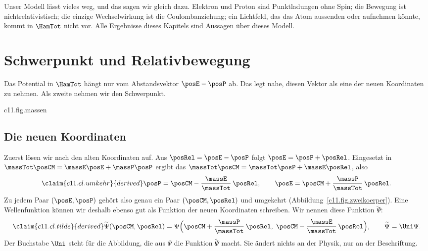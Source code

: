 Unser Modell lässt vieles weg, und das sagen wir gleich dazu. Elektron und Proton sind
Punktladungen ohne Spin; die Bewegung ist nichtrelativistisch; die einzige
Wechselwirkung ist die Coulombanziehung; ein Lichtfeld, das das Atom aussenden oder
aufnehmen könnte, kommt in $\HamTot$ nicht vor. Alle Ergebnisse dieses Kapitels sind
Aussagen über dieses Modell.

\section{Schwerpunkt und Relativbewegung}\label{c11.s2}

Das Potential in $\HamTot$ hängt nur vom Abstandsvektor $\posE - \posP$ ab. Das legt
nahe, diesen Vektor als eine der neuen Koordinaten zu nehmen. Als zweite nehmen wir den
Schwerpunkt.



\begin{tpcfigure}{c11.fig.massen}
  \caption{Wo der Schwerpunkt auf der Strecke vom Proton zum Elektron liegt: nach  im Abstand $(\massE/\massTot)\,\rad$ vom Proton. Bei gleichen Massen ist das die Mitte, beim Massenverhältnis aus Abbildung~\ref{c11.fig.zweikoerper} ein Viertel der Strecke. Im Wasserstoffatom ist das Proton so viel schwerer als das Elektron, dass der Schwerpunkt im Maßstab dieses Bildes mit dem Proton zusammenfällt.}
\end{tpcfigure}

\subsection{Die neuen Koordinaten}\label{c11.s2.1}

Zuerst lösen wir nach den alten Koordinaten auf. Aus $\posRel = \posE - \posP$ folgt
$\posE = \posP + \posRel$. Eingesetzt in
$\massTot\posCM = \massE\posE + \massP\posP$ ergibt das
$\massTot\posCM = \massTot\posP + \massE\posRel$, also
\begin{equation}\label{c11.eq.umkehr}\claim{c11.cl.umkehr}{derived}
  \posP = \posCM - \frac{\massE}{\massTot}\,\posRel,
  \qquad
  \posE = \posCM + \frac{\massP}{\massTot}\,\posRel.
\end{equation}
Zu jedem Paar $(\posE, \posP)$ gehört also genau ein Paar $(\posCM, \posRel)$ und
umgekehrt (Abbildung~\ref{c11.fig.zweikoerper}). Eine Wellenfunktion können wir deshalb
ebenso gut als Funktion der neuen Koordinaten schreiben. Wir nennen diese Funktion
$\widetilde{\Psi}$:
\begin{equation}\label{c11.eq.tilde}\claim{c11.cl.tilde}{derived}
  \widetilde{\Psi}(\posCM, \posRel)
  = \Psi\Bigl(\posCM + \frac{\massP}{\massTot}\,\posRel,\;
              \posCM - \frac{\massE}{\massTot}\,\posRel\Bigr),
  \qquad
  \widetilde{\Psi} = \Uni\Psi.
\end{equation}
Der Buchstabe $\Uni$ steht für die Abbildung, die aus $\Psi$ die Funktion
$\widetilde{\Psi}$ macht. Sie ändert nichts an der Physik, nur an der Beschriftung.

